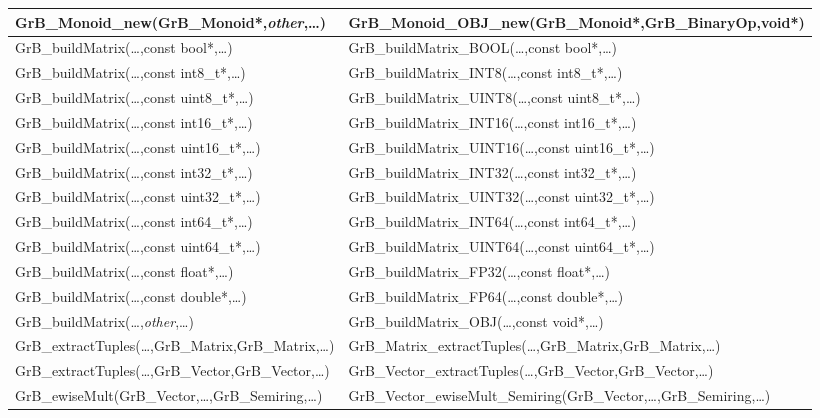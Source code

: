 \begin{table}[htb]
{\begin{tabular}{l|l}
{\sf GrB\_Monoid\_new(GrB\_Monoid*,\emph{other},\ldots)} 	& {\sf GrB\_Monoid\_OBJ\_new(GrB\_Monoid*,GrB\_BinaryOp,void*)} \\ \hline
{\sf GrB\_buildMatrix(\ldots,const bool*,\ldots)}		& {\sf GrB\_buildMatrix\_BOOL(\ldots,const bool*,\ldots)} \\
{\sf GrB\_buildMatrix(\ldots,const int8\_t*,\ldots)}		& {\sf GrB\_buildMatrix\_INT8(\ldots,const int8\_t*,\ldots)} \\
{\sf GrB\_buildMatrix(\ldots,const uint8\_t*,\ldots)}		& {\sf GrB\_buildMatrix\_UINT8(\ldots,const uint8\_t*,\ldots)} \\
{\sf GrB\_buildMatrix(\ldots,const int16\_t*,\ldots)}		& {\sf GrB\_buildMatrix\_INT16(\ldots,const int16\_t*,\ldots)} \\
{\sf GrB\_buildMatrix(\ldots,const uint16\_t*,\ldots)}		& {\sf GrB\_buildMatrix\_UINT16(\ldots,const uint16\_t*,\ldots)} \\
{\sf GrB\_buildMatrix(\ldots,const int32\_t*,\ldots)}		& {\sf GrB\_buildMatrix\_INT32(\ldots,const int32\_t*,\ldots)} \\
{\sf GrB\_buildMatrix(\ldots,const uint32\_t*,\ldots)}		& {\sf GrB\_buildMatrix\_UINT32(\ldots,const uint32\_t*,\ldots)} \\
{\sf GrB\_buildMatrix(\ldots,const int64\_t*,\ldots)}		& {\sf GrB\_buildMatrix\_INT64(\ldots,const int64\_t*,\ldots)} \\
{\sf GrB\_buildMatrix(\ldots,const uint64\_t*,\ldots)}		& {\sf GrB\_buildMatrix\_UINT64(\ldots,const uint64\_t*,\ldots)} \\
{\sf GrB\_buildMatrix(\ldots,const float*,\ldots)}		& {\sf GrB\_buildMatrix\_FP32(\ldots,const float*,\ldots)} \\
{\sf GrB\_buildMatrix(\ldots,const double*,\ldots)}		& {\sf GrB\_buildMatrix\_FP64(\ldots,const double*,\ldots)} \\
{\sf GrB\_buildMatrix(\ldots,\emph{other},\ldots)}		& {\sf GrB\_buildMatrix\_OBJ(\ldots,const void*,\ldots)} \\ \hline
{\sf GrB\_extractTuples(\ldots,GrB\_Matrix,GrB\_Matrix,\ldots)} & {\sf GrB\_Matrix\_extractTuples(\ldots,GrB\_Matrix,GrB\_Matrix,\ldots)} \\
{\sf GrB\_extractTuples(\ldots,GrB\_Vector,GrB\_Vector,\ldots)} & {\sf GrB\_Vector\_extractTuples(\ldots,GrB\_Vector,GrB\_Vector,\ldots)} \\ \hline
{\sf GrB\_ewiseMult(GrB\_Vector,\ldots,GrB\_Semiring,\ldots)} 	& {\sf GrB\_Vector\_ewiseMult\_Semiring(GrB\_Vector,\ldots,GrB\_Semiring,\ldots)} \\

\end{tabular}}
\end{table}
